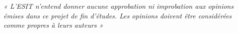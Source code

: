 \thispagestyle{empty} %
\vspace*{\fill}

\begin{center}
    \begin{minipage}{0.8\textwidth}
        \centering
        \onehalfspacing
        \itshape
        « L’ESIT n’entend donner aucune approbation ni improbation aux opinions émises dans ce projet de fin d’études. Les opinions doivent être considérées comme propres à leurs auteurs »
    \end{minipage}
\end{center}

\vspace*{\fill}
\newpage